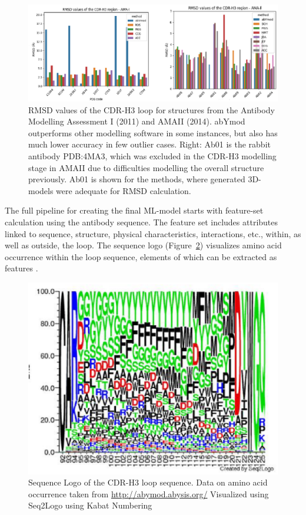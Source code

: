 \documentclass[12pt]{article}
\begin{document}
\begin{figure}
  \centering
  \includegraphics[width=\linewidth]{AMA.eps}
  \caption {RMSD values of the CDR-H3 loop for structures from the
    Antibody Modelling Assessment I (2011) and AMAII (2014). abYmod
    outperforms other modelling software in some instances, but also
    has much lower accuracy in few outlier cases. 
    Right: Ab01 is the rabbit antibody PDB:4MA3, which was
    excluded in the CDR-H3 modelling stage in AMAII due to
    difficulties modelling the overall structure previously. Ab01 is
    shown for the methods, where generated 3D-models were adequate for
    RMSD calculation.}
  \label{fig:AMA}
\end{figure}

The full pipeline for creating the final ML-model
starts with 
feature-set calculation using the antibody sequence. The feature set
includes attributes linked to sequence, structure, physical
characteristics, interactions, etc., within, as well as outside, the
loop. 
The sequence logo (Figure~\ref{fig:logo}) visualizes amino acid
occurrence within the loop sequence, elements of which can be
extracted as features \cite{Thomsen2012,Shaner1993}.

\begin{figure}
  \centering
  \includegraphics[width=\linewidth]{logo.eps}
  \caption {Sequence Logo of the CDR-H3 loop sequence. Data on amino
    acid occurrence taken from \protect\url{http://abymod.abysis.org/} Visualized
    using Seq2Logo using Kabat Numbering}
  \label{fig:logo}
\end{figure}
\end{document}
